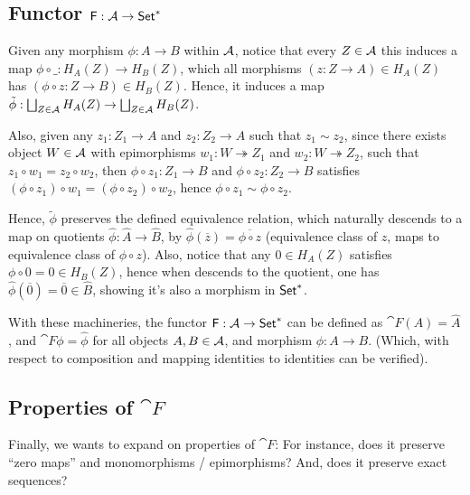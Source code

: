 \documentclass{article}
\begin{document}
\hfil

\subsection{Functor $\mathsf{F}:\cal{A}\rightarrow \mathsf{Set}^*$}
Given any morphism $\phi:A\rightarrow B$ within $\cal{A}$, notice that every $Z\in \cal{A}$ this induces a map $\phi \circ \_:H_A(Z)\rightarrow H_B(Z)$, which all morphisms $(z:Z\rightarrow A)\in H_A(Z)$ has $(\phi\circ z:Z\rightarrow B)\in H_B(Z)$. Hence, it induces a map $\tilde{\phi}:\bigsqcup_{Z\in\cal{A}}H_A(Z)\rightarrow \bigsqcup_{Z\in\cal{A}}H_B(Z)$.

Also, given any $z_1:Z_1\rightarrow A$ and $z_2:Z_2\rightarrow A$ such that $z_1\sim z_2$, since there exists object $W\in\cal{A}$ with epimorphisms $w_1:W\twoheadrightarrow Z_1$ and $w_2:W\twoheadrightarrow Z_2$, such that $z_1\circ w_1=z_2\circ w_2$, then $\phi \circ z_1:Z_1\rightarrow B$ and $\phi\circ z_2:Z_2\rightarrow B$ satisfies $(\phi\circ z_1)\circ w_1=(\phi\circ z_2)\circ w_2$, hence $\phi\circ z_1\sim \phi\circ z_2$.

Hence, $\tilde{\phi}$ preserves the defined equivalence relation, which naturally descends to a map on quotients $\hat{\phi}:\hat{A}\rightarrow \hat{B}$, by $\hat{\phi}(\overline{z}) = \overline{\phi\circ z}$ (equivalence class of $z$, maps to equivalence class of $\phi\circ z$). Also, notice that any $0\in H_A(Z)$ satisfies $\phi\circ 0 = 0\in H_B(Z)$, hence when descends to the quotient, one has $\hat{\phi}(\overline{0})=\overline{0}\in \hat{B}$, showing it's also a morphism in $\mathsf{Set}^*$.

\hfil

With these machineries, the functor $\mathsf{F}:\cal{A}\rightarrow\mathsf{Set}^*$ can be defined as $\cat{F}(A)=\hat{A}$, and $\cat{F} \phi = \hat{\phi}$ for all objects $A,B\in \cal{A}$, and morphism $\phi:A\rightarrow B$. (Which, with respect to composition and mapping identities to identities can be verified).

\hfil

\subsection{Properties of $\cat{F}$}

Finally, we wants to expand on properties of $\cat{F}$: For instance, does it preserve ``zero maps'' and monomorphisms / epimorphisms? And, does it preserve exact sequences?

\hfil
\end{document}
